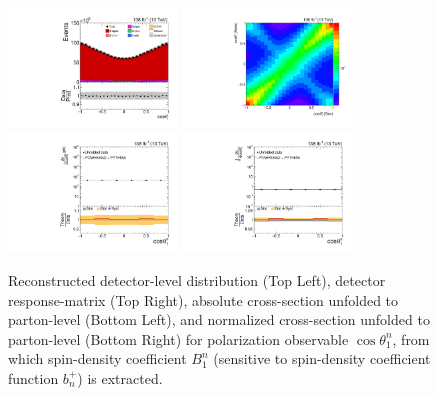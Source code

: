 \clearpage
\begin{figure}[htb]
\begin{center}
 \includegraphics[width=0.40\textwidth]{fig_fullRun2UL/controlplots/combined/Hyp_AntiLeptonBn.pdf}
 \includegraphics[width=0.40\textwidth]{fig_fullRun2UL/unfolding/combined/ResponseMatrix_b1n.pdf} \\
 \includegraphics[width=0.40\textwidth]{fig_fullRun2UL/unfolding/combined/UnfoldedResults_b1n.pdf}
 \includegraphics[width=0.40\textwidth]{fig_fullRun2UL/unfolding/combined/UnfoldedResultsNorm_b1n.pdf} \\
\label{fig:b1n}
\caption{Reconstructed detector-level distribution (Top Left), detector response-matrix (Top Right), absolute cross-section unfolded to parton-level (Bottom Left), and normalized cross-section unfolded to parton-level (Bottom Right) for polarization observable $\cos\theta_{1}^{n}$, from which spin-density coefficient $B_{1}^{n}$ (sensitive to spin-density coefficient function $b_n^{+}$) is extracted.}
\end{center}
\end{figure}
